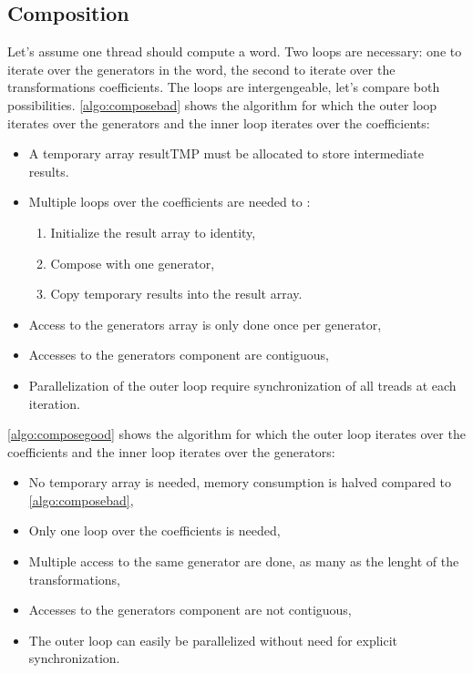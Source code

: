 {\subsection{Composition}
\label{part:compose}
Let's assume one thread should compute a word.
Two loops are necessary: one to iterate over the generators in the word, the second to iterate over the transformations coefficients.
The loops are intergengeable, let's compare both possibilities.
\autoref{algo:composebad} shows the algorithm for which the outer loop iterates over the generators and the inner loop iterates over the coefficients:
\begin{itemize}
\item A temporary array resultTMP must be allocated to store intermediate results.
\item Multiple loops over the coefficients are needed to :
\begin{enumerate}
 \item Initialize the result array to identity,
 \item Compose with one generator,
 \item Copy temporary results into the result array.
 \end{enumerate}
\item Access to the generators array is only done once per generator,
 \item Accesses to the generators component are contiguous,
 \item Parallelization of the outer loop require synchronization of all treads at each iteration.
\end{itemize}
\autoref{algo:composegood} shows the algorithm for which the outer loop iterates over the coefficients and the inner loop iterates over the generators:
\begin{itemize}
 \item No temporary array is needed, memory consumption is halved compared to \autoref{algo:composebad},
 \item Only one loop over the coefficients is needed,
 \item Multiple access to the same generator are done, as many as the lenght of the transformations,
 \item Accesses to the generators component are not contiguous,
 \item The outer loop can easily be parallelized without need for explicit synchronization.
\end{itemize}

}

